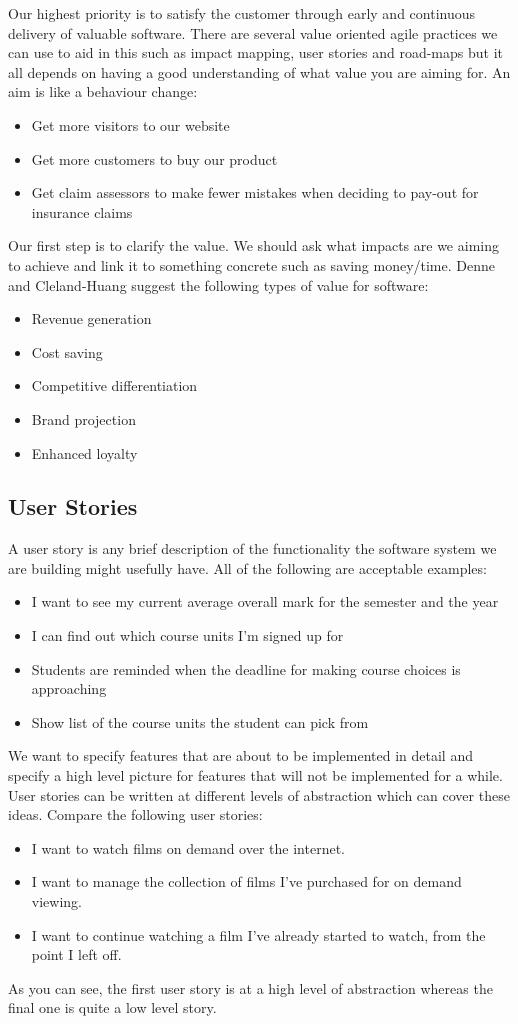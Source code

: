 \documentclass{article}
\begin{document}
Our highest priority is to satisfy the customer through early and continuous delivery of valuable software. There are several value oriented agile practices we can use to aid in this such as impact mapping, user stories and road-maps but it all depends on having a good understanding of what value you are aiming for. An aim is like a behaviour change:
\begin{itemize}
	\item Get more visitors to our website
	\item Get more customers to buy our product
	\item Get claim assessors to make fewer mistakes when deciding to pay-out for insurance claims
\end{itemize}
Our first step is to clarify the value. We should ask what impacts are we aiming to achieve and link it to something concrete such as saving money/time. Denne and Cleland-Huang suggest the following types of value for software:
\begin{itemize}
	\item Revenue generation
	\item Cost saving
	\item Competitive differentiation
	\item Brand projection
	\item Enhanced loyalty
\end{itemize}

\subsection{User Stories}
A user story is any brief description of the functionality the software system we are building might usefully have. All of the following are acceptable examples:
\begin{itemize}
	\item I want to see my current average overall mark for the semester and the year
	\item I can find out which course units I'm signed up for
	\item Students are reminded when the deadline for making course choices is approaching
	\item Show list of the course units the student can pick from
\end{itemize}
We want to specify features that are about to be implemented in detail and specify a high level picture for features that will not be implemented for a while. User stories can be written at different levels of abstraction which can cover these ideas. Compare the following user stories:
\begin{itemize}
	\item I want to watch films on demand over the internet.
	\item I want to manage the collection of films I've purchased for on demand viewing.
	\item I want to continue watching a film I've already started to watch, from the point I left off.
\end{itemize}
As you can see, the first user story is at a high level of abstraction whereas the final one is quite a low level story.
\end{document}
